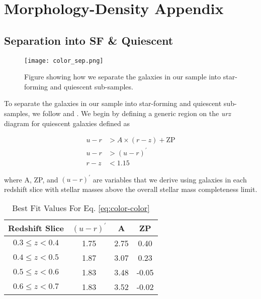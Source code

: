 \chapter*{Morphology-Density Appendix} \label{chap:morph_den_ap}

\section{Separation into SF \& Quiescent} \label{sec_c4:ap:cc_sel}

\begin{figure*}[htb]
    \centering
    \texttt{[image: color\_sep.png]}
    \caption{Figure showing how we separate the galaxies in our sample into star-forming and quiescent sub-samples.}
    \label{fig_c4:color_sep}
\end{figure*}

To separate the galaxies in our sample into star-forming and quiescent sub-samples, we follow \citet{Kawin16} and \citet{hsc_mass_size}. We begin by defining a generic region on the \textit{urz} diagram for quiescent galaxies defined as 

\begin{equation}
    \begin{aligned}
        u-r & >A \times(r-z)+\mathrm{ZP} \\
        u-r & >(u-r)^{\prime} \\
        r-z & <1.15
\end{aligned}
\label{eq:color-color}
\end{equation}

where A, ZP, and $(u-r)^{\prime}$ are variables that we derive using galaxies in each redshift slice with stellar masses above the overall stellar mass completeness limit. 

\begin{table}[]
    \centering
    \caption{Best Fit Values For Eq. \ref{eq:color-color}  \label{tab_c4:color-color}}
    \begin{tabular}{cccc}
    \hline
    \hline
     Redshift Slice & $(u-r)^{\prime}$ & A & ZP \\
     \hline
     \hline
     $0.3 \leq z < 0.4$ & 1.75 & 2.75 & 0.40 \\
     $0.4 \leq z < 0.5$ & 1.87 & 3.07 & 0.23 \\
     $0.5 \leq z < 0.6$ & 1.83 & 3.48 & -0.05 \\
     $0.6 \leq z < 0.7$ & 1.83 & 3.52 & -0.02 \\
     \hline
     \hline
    \end{tabular}
\end{table}

